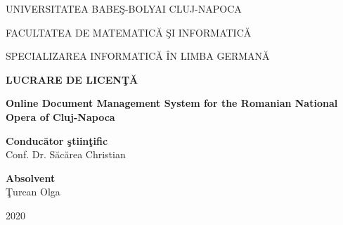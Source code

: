 \documentclass[a4paper,12pt]{report}
\begin{document}
\begin{titlepage}
  \sloppy
  \begin{center}
    UNIVERSITATEA BABE\c S-BOLYAI CLUJ-NAPOCA

    FACULTATEA DE MATEMATIC\u A \c SI INFORMATIC\u A

    SPECIALIZAREA INFORMATIC\u A \^ IN LIMBA GERMAN\u A

    \vspace{6cm}

    \Huge \textbf{LUCRARE DE LICEN\c T\u A}

    \vspace{0.5cm}

    \Huge \textbf{Online Document Management System for the Romanian National Opera of Cluj-Napoca}

  \end{center}

  \vspace{3cm}

  \begin{flushleft}
    \Large{\textbf{Conduc\u ator \c stiin\c tific}}\\
    Conf. Dr. S\u{a}c\u{a}rea Christian
  \end{flushleft}

  \begin{flushright}
    \Large{\textbf{Absolvent}}\\
    \c Turcan Olga
  \end{flushright}

  \vspace{3cm}

  \begin{center}
    2020
  \end{center}
\end{titlepage}
\end{document}
